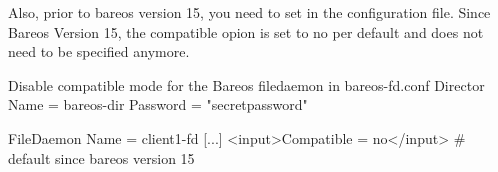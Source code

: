 Also, prior to bareos version 15, you need to set  in the  configuration file.
Since Bareos Version 15, the compatible opion is set to no per default and does not need to be specified anymore.
\begin{bconfig}{Disable compatible mode for the Bareos filedaemon in bareos-fd.conf} 
Director {
  Name = bareos-dir
  Password = "secretpassword"
}

FileDaemon {
   Name = client1-fd
   [...]
   <input>Compatible = no</input> # default since bareos version 15
}
\end{bconfig}
